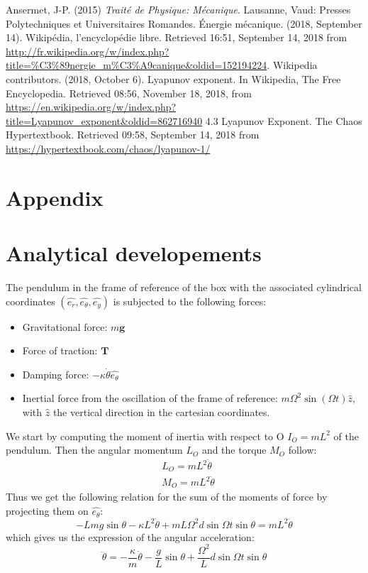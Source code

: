 \documentclass[a4paper,12pt,twoside]{article}
\begin{document}
\newpage

\begin{thebibliography}{99}
	 Ansermet, J-P. (2015) \textit{Traité de Physique: Mécanique}. Lausanne, Vaud: Presses Polytechniques et Universitaires Romandes.
	 Énergie mécanique. (2018, September 14). Wikipédia, l'encyclopédie libre. Retrieved 16:51, September 14, 2018 from \url{http://fr.wikipedia.org/w/index.php?title=%C3%89nergie_m%C3%A9canique&oldid=152194224}.
	 Wikipedia contributors. (2018, October 6). Lyapunov exponent. In Wikipedia, The Free Encyclopedia. Retrieved 08:56, November 18, 2018, from \url{https://en.wikipedia.org/w/index.php?title=Lyapunov_exponent&oldid=862716940}
	 4.3 Lyapunov Exponent. The Chaos Hypertextbook. Retrieved 09:58, September 14, 2018 from \url{https://hypertextbook.com/chaos/lyapunov-1/}
\end{thebibliography}

\newpage

\section*{Appendix}
\appendix

\section{Analytical developements}\label{ann:eq-diff}
The pendulum in the frame of reference of the box with the associated cylindrical coordinates $(\hat{e_r}, \hat{e_\theta}, \hat{e_y})$ is subjected to the following forces:
\begin{itemize}
	\item Gravitational force: $m\mathbf{g}$
	\item Force of traction: $\mathbf{T}$
	\item Damping force: $-\kappa \dot{\theta} \hat{e_\theta}$
	\item Inertial force from the oscillation of the frame of reference: $m \Omega^2 \sin(\Omega t) \hat{z}$, with $\hat{z}$ the vertical direction in the cartesian coordinates.
\end{itemize}

We start by computing the moment of inertia with respect to O $I_O = mL^2$ of the pendulum. Then the angular momentum $L_O$ and the torque $M_O$ follow:
\begin{align*}
	&L_O = mL^2\dot{\theta}\\
	&M_O = mL^2\ddot{\theta}
\end{align*}
Thus we get the following relation for the sum of the moments of force by projecting them on $\hat{e_\theta}$:
\begin{equation*}
-Lmg\sin\theta-\kappa L^2\dot{\theta} + mL\Omega^2 d \sin{\Omega t} \sin\theta = mL^2\ddot{\theta}
\end{equation*}
which gives us the expression of the angular acceleration:
\begin{equation*}
\ddot{\theta} = -\frac{\kappa}{m}\dot{\theta} - \frac{g}{L}\sin\theta + \frac{\Omega^2}{L} d \sin{\Omega t} \sin\theta
\end{equation*}
\end{document}
